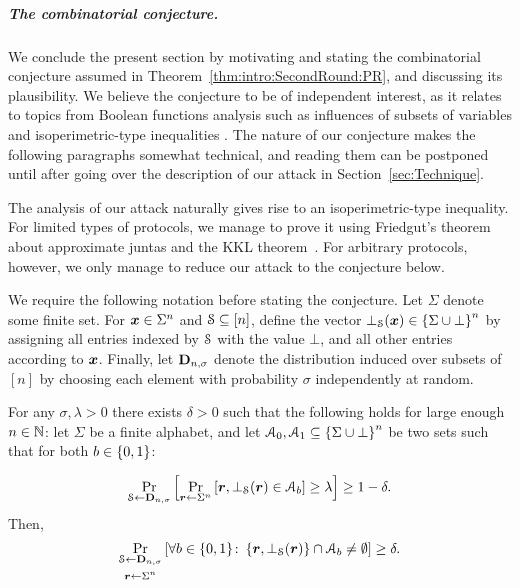 \subparagraph{The combinatorial conjecture.}
We conclude the present section by motivating and stating the combinatorial conjecture assumed in Theorem~\ref{thm:intro:SecondRound:PR}, and discussing its plausibility. We believe the conjecture to be of independent interest, as it relates to topics from Boolean functions analysis such as influences of subsets of variables \cite{Odonnel14} and isoperimetric-type inequalities \cite{MosselORSS2006,MosselOS2013}. The nature of our conjecture makes the following paragraphs somewhat technical, and reading them can be postponed until after going over the description of our attack in Section~\ref{sec:Technique}.

The analysis of our attack naturally gives rise to an isoperimetric-type inequality. For limited types of protocols, we manage to prove it using Friedgut's theorem~\cite{Friedgut98} about approximate juntas and the KKL theorem~\cite{KKL88}. For arbitrary protocols, however, we only manage to reduce our attack to the conjecture below.

We require the following notation before stating the conjecture. Let $\Sigma$ denote some finite set.
For ${ \boldsymbol{x}}\in \Sigma^n$ and $\mathcal{S} \subseteq [n]$, define the vector $\bot_{\mathcal{S}}({ \boldsymbol{x}}) \in \left\{\Sigma \cup \bot\right\}^n$ by assigning all entries indexed by $\mathcal{S}$ with the value $\bot$, and all other entries according to ${ \boldsymbol{x}}$. Finally, let $\mathbf{D}_{n,\sigma}$ denote the distribution induced over subsets of $[n]$ by choosing each element with probability $\sigma$ independently at random.

\def\MainConj{
For any $\sigma,\lambda >0$ there exists $\delta>0$ such that the following holds for large enough $n\in \N$: let $\Sigma$ be a finite alphabet, and let $\cA_0,\cA_1 \subseteq \sbn$ be two sets such that for both $b\in \zo$:

\begin{align*}
\ppr{\cs\gets \bns}{\ppr{\vr \gets \Sigma^n}{\vr,\bot_{\cS}(\vr) \in \cA_b} \ge \lambda } \ge 1-\delta.
\end{align*}
Then,
\begin{align*}
\ppr{\substack{\cS \gets \bns \vspace{.05in}\\ \vr\gets \Sigma^n }}{\forall b\in \zo\colon \set{\vr,\bot_{\cS}(\vr)} \cap \cA_b \neq \emptyset} \ge \delta.
\end{align*}
}

\begin{conjecture}\label{con:intro:IsoBot}
\MainConj
\end{conjecture}

